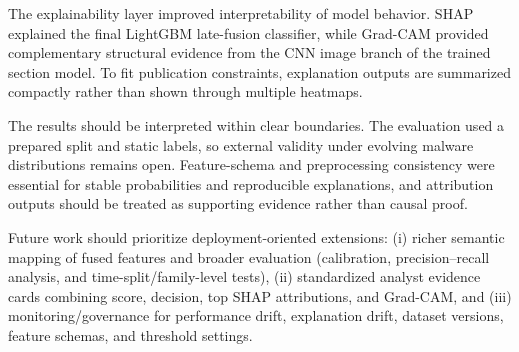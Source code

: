\documentclass[conference]{IEEEtran}
\begin{document}
The explainability layer improved interpretability of model behavior.
SHAP explained the final LightGBM late-fusion classifier, while Grad-CAM provided complementary structural evidence from the CNN image branch of the trained section model.
To fit publication constraints, explanation outputs are summarized compactly rather than shown through multiple heatmaps.

The results should be interpreted within clear boundaries.
The evaluation used a prepared split and static labels, so external validity under evolving malware distributions remains open.
Feature-schema and preprocessing consistency were essential for stable probabilities and reproducible explanations, and attribution outputs should be treated as supporting evidence rather than causal proof.

Future work should prioritize deployment-oriented extensions: (i) richer semantic mapping of fused features and broader evaluation (calibration, precision--recall analysis, and time-split/family-level tests), (ii) standardized analyst evidence cards combining score, decision, top SHAP attributions, and Grad-CAM, and (iii) monitoring/governance for performance drift, explanation drift, dataset versions, feature schemas, and threshold settings.





\end{document}

